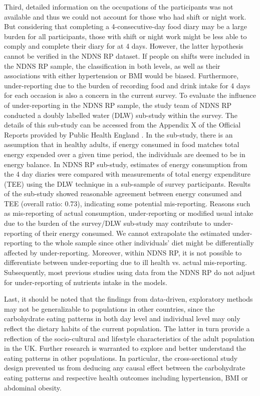 Third, detailed information on the occupations of the participants was not available and thus we could not account for those who had shift or night work. But considering that completing a 4-consecutive-day food diary may be a large burden for all participants, those with shift or night work might be less able to comply and complete their diary for at 4 days. However, the latter hypothesis cannot be verified in the NDNS RP dataset. If people on shifts were included in the NDNS RP sample, the classification in both levels, as well as their associations with either hypertension or BMI would be biased. Furthermore, under-reporting due to the burden of recording food and drink intake for 4 days for each occasion is also a concern in the current survey. To evaluate the influence of under-reporting in the NDNS RP sample, the study team of NDNS RP conducted a doubly labelled water (DLW) sub-study within the survey. The details of this sub-study can be accessed from the Appendix X of the Official Reports provided by Public Health England \parencite{bates2014national,roberts2018national,NDNSofficial}. In the sub-study, there is an assumption that in healthy adults, if energy consumed in food matches total energy expended over a given time period, the individuals are deemed to be in energy balance. In NDNS RP sub-study, estimates of energy consumption from the 4 day diaries were compared with measurements of total energy expenditure (TEE) using the DLW technique in a sub-sample of survey participants. Results of the sub-study showed reasonable agreement between energy consumed and TEE (overall ratio: 0.73), indicating some potential mis-reporting. Reasons such as mis-reporting of actual consumption, under-reporting or modified usual intake due to the burden of the survey/DLW sub-study may contribute to under-reporting of their energy consumed. We cannot extrapolate the estimated under-reporting to the whole sample since other individuals' diet might be differentially affected by under-reporting. Moreover, within NDNS RP, it is not possible to differentiate between under-reporting due to ill health vs. actual mis-reporting. Subsequently, most previous studies using data from the NDNS RP do not adjust for under-reporting of nutrients intake in the models.

Last, it should be noted that the findings from data-driven, exploratory methods may not be
generalizable to populations in other countries, since the carbohydrate eating patterns in both day level and individual level may only reflect the dietary habits of the current population. The latter in turn provide a reflection of the socio-cultural and lifestyle characteristics of the adult population in the UK. Further research is warranted to explore and better understand the eating patterns in other populations. In particular, the cross-sectional study design prevented us from deducing any causal effect between the carbohydrate eating patterns and respective health outcomes including hypertension, BMI or abdominal obesity. 

